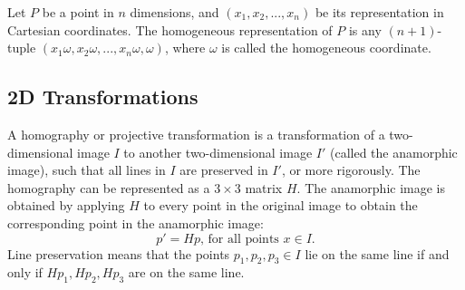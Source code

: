 \documentclass[11pt, oneside, reqno]{book}
\begin{document}
\begin{definition}  
\label{def:degrees}
Let $P$ be a point in $n$ dimensions, and $(x_1, x_2, ..., x_n)$ be its representation in Cartesian coordinates. The homogeneous representation of $P$ is any $(n+1)$-tuple $(x_1\omega, x_2\omega, ..., x_n\omega, \omega)$, where $\omega$ is called the homogeneous coordinate. 
\end{definition}






\subsection{2D Transformations}

\begin{definition}[Translation]  
\label{def:translation}

\end{definition}

\begin{definition}[Scaling]  
\label{def:scaling}

\end{definition}

\begin{definition}[Rotation]  
\label{def:rotation}

\end{definition}

\begin{definition}[Warping]  
\label{def:warp}

\end{definition}

\begin{definition}  
\label{def:forwarp}

\end{definition}

\begin{definition}  
\label{def:backwarp}

\end{definition}

\begin{definition}[Homography]  
\label{def:homography}
A homography or projective transformation is a transformation of a two-dimensional image $I$ to another two-dimensional image $I'$ (called the anamorphic image), such that all lines in $I$ are preserved in $I'$, or more rigorously. The homography can be represented as a $3 \times 3$ matrix $H$. The anamorphic image is obtained by applying $H$ to every point in the original image to obtain the corresponding point in the anamorphic image:
\[ p'=Hp \text{, for all points } x\in I. \] %
Line preservation means that the points $p_1, p_2, p_3 \in I$ lie on the same line if and only if $Hp_1, Hp_2, Hp_3$ are on the same line.
\end{definition}
\end{document}
